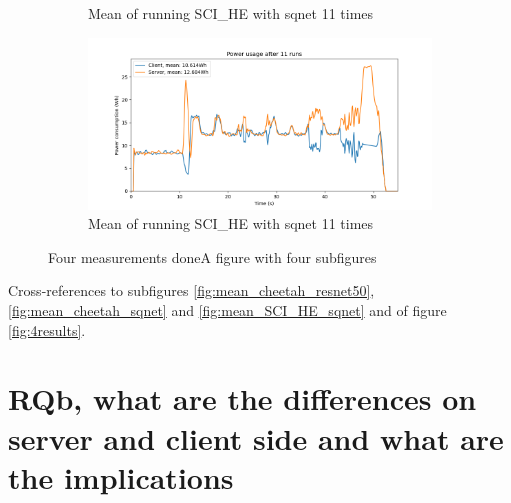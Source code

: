 \documentclass[../thesis.tex]{subfiles}
\begin{document}
\begin{figure}[hbt!]
\begin{subfigure}{\linewidth}
            \caption{Mean of running SCI\_HE with sqnet 11 times}
            \label{fig:bmean_SCI_HE_sqnet}
    \end{subfigure}
    \begin{subfigure}{\linewidth}
            \includegraphics[width=\textwidth]{Thesis/Images/Means/mean_SCI_HE_sqnet.png}
            \caption{Mean of running SCI\_HE with sqnet 11 times}
            \label{fig:bfmean_SCI_HE_sqnet}
    \end{subfigure}

    \caption{Four measurements doneA figure with four subfigures}
    \label{fig:4results2}
\end{figure}

\noindent
Cross-references to subfigures \ref{fig:mean_cheetah_resnet50}, \ref{fig:mean_cheetah_sqnet} and \ref{fig:mean_SCI_HE_sqnet} and of figure \ref{fig:4results}.

\section{RQb, what are the differences on server and client side and what are the implications}
\end{document}
